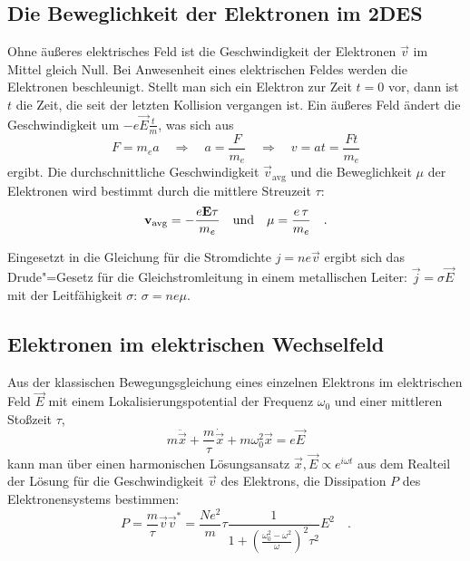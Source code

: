 \subsection{Die Beweglichkeit der Elektronen im 2DES}
\label{ssec:mobility}
Ohne äußeres elektrisches Feld ist die Geschwindigkeit der Elektronen $\vec v$ im Mittel gleich Null. Bei Anwesenheit eines elektrischen Feldes werden die Elektronen beschleunigt. Stellt man sich ein Elektron zur Zeit $t=0$ vor, dann ist $t$ die Zeit, die seit der letzten Kollision vergangen ist. Ein äußeres Feld ändert die Geschwindigkeit um $-e\vec E\frac{t}{m}$, was sich aus
    \begin{equation}
        F=m_ea\quad\Rightarrow\quad a=\frac{F}{m_e}\quad\Rightarrow\quad v=at=\frac{Ft}{m_e}
    \end{equation}
ergibt. Die durchschnittliche Geschwindigkeit $\vec v_\text{avg}$ und die Beweglichkeit $\mu$ der Elektronen wird bestimmt durch die mittlere Streuzeit $\tau$:
    \begin{equation}
        \bold v_\text{avg}=-\frac{e\bold E\tau}{m_e}\quad\text{und}\quad		\mu=\frac{e\,\tau}{m_e}\quad.
    \end{equation}

Eingesetzt in die Gleichung für die Stromdichte $j=n e \vec v$ ergibt sich das Drude"=Gesetz für die Gleichstromleitung in einem metallischen Leiter:
	$\vec j = \sigma\vec E$ mit der Leitfähigkeit $\sigma$: $\sigma=n e \mu$.

\subsection{Elektronen im elektrischen Wechselfeld}
\label{ssec:eqns_of_motion}
Aus der klassischen Bewegungsgleichung eines einzelnen Elektrons im elektrischen Feld $\vec E$ mit einem Lokalisierungspotential der Frequenz $\omega_0$ und einer mittleren Stoßzeit $\tau$, 
\begin{equation}
		m\ddot{\vec x}+\frac{m}{\tau}\dot{\vec x}+m\omega_0^2\vec x=e\vec E
\end{equation}
kann man über einen harmonischen Lösungsansatz $\vec x, \vec E\propto e^{i\omega t}$ aus dem Realteil der Lösung für die Geschwindigkeit $\vec v$ des Elektrons, die Dissipation $P$ des Elektronensystems bestimmen:
\begin{equation}
	P=\frac{m}{\tau}\vec v\vec v^*=\frac{Ne^2}{m}\tau\frac{1}{1+\left(\frac{\omega_0^2-\omega^2}{\omega}\right)^2\tau^2}E^2\quad.
\end{equation}

